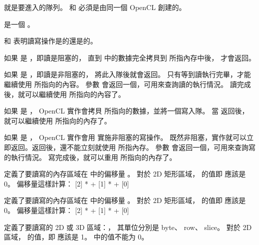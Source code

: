  就是要進入的隊列。
 和  必須是由同一個 OpenCL 創建的。

 是一個 。

 和 
表明讀寫操作是{}的還是{}的。

如果  是 ，即讀是阻塞的，
直到  中的數據完全拷貝到  所指內存中後，
 才會返回。

如果  是 ，即讀是非阻塞的，
 將此入隊後就會返回。
只有等到讀執行完畢，才能繼續使用  所指向的內容。
參數  會返回一個，可用來查詢讀的執行情況。
讀完成後，就可以繼續使用  所指向的內容了。

如果  是 ，
OpenCL 實作會拷貝  所指向的數據，並將一個寫入隊。
當  返回後，
就可以繼續使用  所指向的內存了。

如果  是 ，
OpenCL 實作會用  實施非阻塞的寫操作。
既然非阻塞，實作就可以立即返回。返回後，還不能立刻就使用  所指內存。
參數  會返回一個，可用來查詢寫的執行情況。
寫完成後，就可以重用  所指向的內存了。

 定義了要讀寫的內存區域在  中的偏移量 。
對於 2D 矩形區域， 的值即  應該是 0。
偏移量這樣計算：
\startformula \startalign
 \NC  \NC {}[2] *  \NR
 \NC + \NC {}[1] *  \NR
 \NC + \NC {}[0] \NR
\stopalign \stopformula

 定義了要讀寫的內存區域在  中的偏移量 。
對於 2D 矩形區域， 的值即  應該是 0。
偏移量這樣計算：
\startformula \startalign
 \NC  \NC {}[2] *  \NR
 \NC + \NC {}[1] *  \NR
 \NC + \NC {}[0] \NR
\stopalign \stopformula

 定義了要讀寫的 2D 或 3D 區域：，
其單位分別是 byte、 row、 slice。
對於 2D 區域，  的值，即  應該是 1。
 中的值不能为 0。

